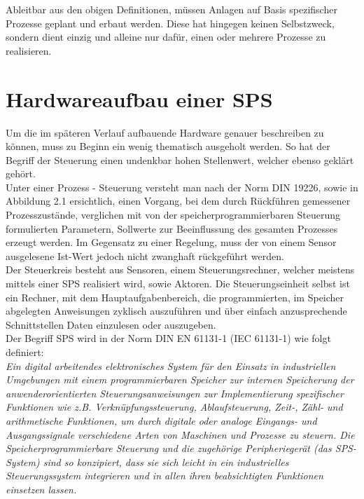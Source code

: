 	Ableitbar aus den obigen Definitionen, müssen Anlagen auf Basis spezifischer Prozesse geplant und erbaut werden. Diese hat hingegen keinen Selbstzweck, sondern dient einzig und alleine nur dafür, einen oder mehrere Prozesse zu realisieren.\\

	\section{Hardwareaufbau einer SPS}
	
	Um die im späteren Verlauf aufbauende Hardware genauer beschreiben zu können, muss zu Beginn ein wenig thematisch ausgeholt werden. So hat der Begriff der Steuerung einen undenkbar hohen Stellenwert, welcher ebenso geklärt gehört.\\
	
	Unter einer Prozess - Steuerung versteht man nach der Norm DIN 19226, sowie in Abbildung 2.1 ersichtlich, einen Vorgang, bei dem durch Rückführen gemessener Prozesszustände, verglichen mit von der speicherprogrammierbaren Steuerung formulierten Parametern, Sollwerte zur Beeinflussung des gesamten Prozesses erzeugt werden. Im Gegensatz zu einer Regelung, muss der von einem Sensor ausgelesene Ist-Wert jedoch nicht zwanghaft rückgeführt werden. \\
	
	Der Steuerkreis besteht aus Sensoren, einem Steuerungsrechner, welcher meistens mittels einer SPS realisiert wird, sowie Aktoren. Die Steuerungseinheit selbst ist ein Rechner, mit dem Hauptaufgabenbereich, die programmierten, im Speicher abgelegten Anweisungen zyklisch auszuführen und über einfach anzusprechende Schnittstellen Daten einzulesen oder auszugeben. \cite{mseitz_sps} \\
	
	Der Begriff SPS wird in der Norm DIN EN 61131-1 (IEC 61131-1) wie folgt definiert:\\
	
	\glqq \textit{Ein digital arbeitendes elektronisches System für den Einsatz in industriellen Umgebungen mit einem programmierbaren Speicher zur internen Speicherung der anwenderorientierten Steuerungsanweisungen zur Implementierung spezifischer Funktionen wie z.B. Verknüpfungssteuerung, Ablaufsteuerung, Zeit-, Zähl- und arithmetische Funktionen, um durch digitale oder analoge Eingangs- und Ausgangssignale verschiedene Arten von Maschinen und Prozesse zu steuern. Die Speicherprogrammierbare Steuerung und die zugehörige Peripheriegerät (das SPS- System) sind so konzipiert, dass sie sich leicht in ein industrielles Steuerungssystem integrieren und in allen ihren beabsichtigten Funktionen einsetzen lassen.}\grqq \space \cite{sps_programmierung}\\
 
